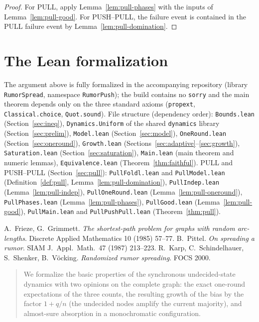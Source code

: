 \begin{proof}
  For PULL, apply Lemma~\ref{lem:pull-phases} with the inputs of
  Lemma~\ref{lem:pull-good}. For PUSH--PULL, the failure event is contained
  in the PULL failure event by Lemma~\ref{lem:pull-domination}.
\end{proof}

\section{The Lean formalization}\label{sec:lean}

The argument above is fully formalized in the accompanying repository
(library \texttt{RumorSpread}, namespace \texttt{RumorPush}); the build
contains no \texttt{sorry} and the main theorem depends only on the three
standard axioms (\texttt{propext}, \texttt{Classical.choice},
\texttt{Quot.sound}). File structure (dependency order):
\texttt{Bounds.lean} (Section~\ref{sec:ineq}), \texttt{Dynamics.Uniform}
of the shared \texttt{dynamics} library (Section~\ref{sec:prelim}), \texttt{Model.lean}
(Section~\ref{sec:model}), \texttt{OneRound.lean}
(Section~\ref{sec:oneround}), \texttt{Growth.lean}
(Sections~\ref{sec:adaptive}--\ref{sec:growth}), \texttt{Saturation.lean}
(Section~\ref{sec:saturation}), \texttt{Main.lean} (main theorem and
numeric lemmas), \texttt{Equivalence.lean} (Theorem~\ref{thm:faithful}).
PULL and PUSH--PULL (Section~\ref{sec:pull}): \texttt{PullFoldl.lean} and
\texttt{PullModel.lean} (Definition~\ref{def:pull},
Lemma~\ref{lem:pull-domination}), \texttt{PullIndep.lean}
(Lemma~\ref{lem:pull-indep}), \texttt{PullOneRound.lean}
(Lemma~\ref{lem:pull-oneround}), \texttt{PullPhases.lean}
(Lemma~\ref{lem:pull-phases}), \texttt{PullGood.lean}
(Lemma~\ref{lem:pull-good}), \texttt{PullMain.lean} and
\texttt{PullPushPull.lean} (Theorem~\ref{thm:pull}).

\begin{thebibliography}{9}
 A.~Frieze, G.~Grimmett.
\emph{The shortest-path problem for graphs with random arc-lengths}.
Discrete Applied Mathematics 10 (1985) 57--77.
 B.~Pittel.
\emph{On spreading a rumor}. SIAM J.\ Appl.\ Math.\ 47 (1987) 213--223.
 R.~Karp, C.~Schindelhauer, S.~Shenker, B.~V\"ocking.
\emph{Randomized rumor spreading}. FOCS 2000.
\end{thebibliography}


\begin{abstract}
We formalize the basic properties of the synchronous undecided-state dynamics with two opinions
on the complete graph: the exact one-round expectations of the three counts, the resulting
growth of the bias by the factor $1+q/n$ (the undecided nodes amplify the current majority), and
almost-sure absorption in a monochromatic configuration.
\end{abstract}

